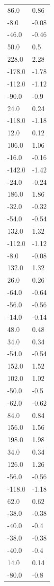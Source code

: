 \begin{longtable}{ll}
86.0 & 0.86 \\
-8.0 & -0.08 \\
-46.0 & -0.46 \\
50.0 & 0.5 \\
228.0 & 2.28 \\
-178.0 & -1.78 \\
-112.0 & -1.12 \\
-90.0 & -0.9 \\
24.0 & 0.24 \\
-118.0 & -1.18 \\
12.0 & 0.12 \\
106.0 & 1.06 \\
-16.0 & -0.16 \\
-142.0 & -1.42 \\
-24.0 & -0.24 \\
186.0 & 1.86 \\
-32.0 & -0.32 \\
-54.0 & -0.54 \\
132.0 & 1.32 \\
-112.0 & -1.12 \\
-8.0 & -0.08 \\
132.0 & 1.32 \\
26.0 & 0.26 \\
-64.0 & -0.64 \\
-56.0 & -0.56 \\
-14.0 & -0.14 \\
48.0 & 0.48 \\
34.0 & 0.34 \\
-54.0 & -0.54 \\
152.0 & 1.52 \\
102.0 & 1.02 \\
-50.0 & -0.5 \\
-62.0 & -0.62 \\
84.0 & 0.84 \\
156.0 & 1.56 \\
198.0 & 1.98 \\
34.0 & 0.34 \\
126.0 & 1.26 \\
-56.0 & -0.56 \\
-118.0 & -1.18 \\
62.0 & 0.62 \\
-38.0 & -0.38 \\
-40.0 & -0.4 \\
-38.0 & -0.38 \\
-40.0 & -0.4 \\
14.0 & 0.14 \\
-80.0 & -0.8 \\

\end{longtable}
